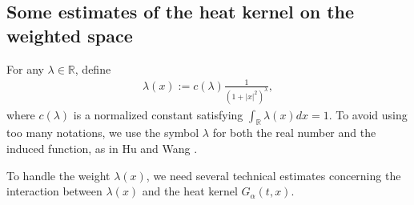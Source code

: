 \documentclass[11pt,reqno]{amsart}
\numberwithin{equation}{section}
\newcommand{\1}{{\bf 1}}
\newcommand{\2}{{\bf 2}}
\begin{document}
 

\subsection{Some estimates of the heat kernel on the weighted space}
 
For any $\lambda\in \mathbb R$,  define 
\begin{align}\label{eq lambda}
\lambda(x):= c(\lambda) \frac{1}{(1+|x|^2)^{\lambda}},
\end{align}
 where $c(\lambda)$ is a normalized constant satisfying $\int_{\mathbb{R}}\lambda(x)dx=1$.  
To avoid using too many notations, we use the symbol  $\lambda$
for both the real number and the induced function, as in Hu and Wang \cite{HW2022}.

To handle  the weight $\lambda(x)$, we need several  technical estimates concerning the interaction between $\lambda(x)$ and the heat kernel $G_{\alpha}(t,x)$.
\end{document}
